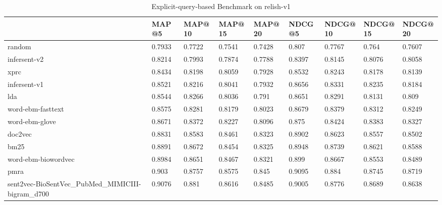 \begin{table}
\centering
\caption{Explicit-query-based Benchmark on relish-v1}
\label{tab:query-benchmark-relish-v1}
\begin{tabular}{lllllllll}
\toprule
{} &    MAP@5 &  MAP@10 &  MAP@15 &  MAP@20 &   NDCG@5 & NDCG@10 & NDCG@15 & NDCG@20 \\
\midrule
random                                          &   0.7933 &  0.7722 &  0.7541 &  0.7428 &    0.807 &  0.7767 &   0.764 &  0.7607 \\
infersent-v2                                    &   0.8214 &  0.7993 &  0.7874 &  0.7788 &   0.8397 &  0.8145 &  0.8076 &  0.8058 \\
xprc                                            &   0.8434 &  0.8198 &  0.8059 &  0.7928 &   0.8532 &  0.8243 &  0.8178 &  0.8139 \\
infersent-v1                                    &   0.8521 &  0.8216 &  0.8041 &  0.7932 &   0.8656 &  0.8331 &  0.8235 &  0.8184 \\
lda                                             &   0.8544 &  0.8266 &  0.8036 &   0.791 &   0.8651 &  0.8291 &  0.8131 &   0.809 \\
word-ebm-fasttext                               &   0.8575 &  0.8281 &  0.8179 &  0.8023 &   0.8679 &  0.8379 &  0.8312 &  0.8249 \\
word-ebm-glove                                  &   0.8671 &  0.8372 &  0.8227 &  0.8096 &    0.875 &  0.8424 &  0.8383 &  0.8327 \\
doc2vec                                         &   0.8831 &  0.8583 &  0.8461 &  0.8323 &   0.8902 &  0.8623 &  0.8557 &  0.8502 \\
bm25                                            &   0.8891 &  0.8672 &  0.8454 &  0.8325 &   0.8948 &  0.8739 &  0.8621 &  0.8588 \\
word-ebm-biowordvec                             &   0.8984 &  0.8651 &  0.8467 &  0.8321 &    0.899 &  0.8667 &  0.8553 &  0.8489 \\
pmra                                            &    0.903 &  0.8757 &  0.8575 &   0.845 &   0.9095 &   0.884 &  0.8745 &  0.8719 \\
sent2vec-BioSentVec\_PubMed\_MIMICIII-bigram\_d700 &   0.9076 &   0.881 &  0.8616 &  0.8485 &   0.9005 &  0.8776 &  0.8689 &  0.8638 \\
\bottomrule
\end{tabular}
\end{table}


